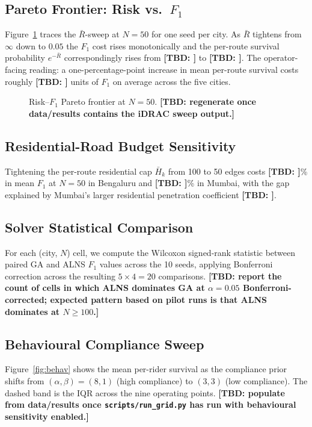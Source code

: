 \documentclass{ieeeaccess}
\newcommand{\TBD}[1]{\textbf{[TBD: #1]}}
\begin{document}
\subsection{Pareto Frontier: Risk vs.\ $F_1$}
Figure~\ref{fig:pareto} traces the $\bar{R}$-sweep at $N = 50$ for one
seed per city. As $\bar{R}$ tightens from $\infty$ down to $0.05$ the
$F_1$ cost rises monotonically and the per-route survival probability
$e^{-\bar{R}}$ correspondingly rises from \TBD{} to \TBD{}. The
operator-facing reading: a one-percentage-point increase in mean
per-route survival costs roughly \TBD{} units of $F_1$ on average across
the five cities.

\begin{figure}
\centerline{}
\caption{Risk--$F_1$ Pareto frontier at $N = 50$. \TBD{regenerate
once data/results contains the iDRAC sweep output.}}
\label{fig:pareto}
\end{figure}

\subsection{Residential-Road Budget Sensitivity}
Tightening the per-route residential cap $\bar{H}_k$ from 100 to 50
edges costs \TBD{}\% in mean $F_1$ at $N = 50$ in Bengaluru and \TBD{}\%
in Mumbai, with the gap explained by Mumbai's larger residential
penetration coefficient \TBD{}.

\subsection{Solver Statistical Comparison}
For each (city, $N$) cell, we compute the Wilcoxon signed-rank
statistic \cite{wilcoxon1945} between paired GA and ALNS $F_1$ values
across the 10 seeds, applying Bonferroni correction across the
resulting
$5 \times 4 = 20$ comparisons. \TBD{report the count of cells in
which ALNS dominates GA at $\alpha = 0.05$ Bonferroni-corrected;
expected pattern based on pilot runs is that ALNS dominates at
$N \geq 100$.}

\subsection{Behavioural Compliance Sweep}
Figure~\ref{fig:behav} shows the mean per-rider survival as the
compliance prior shifts from $(\alpha, \beta) = (8, 1)$ (high
compliance) to $(3, 3)$ (low compliance). The dashed band is the IQR
across the nine operating points. \TBD{populate from data/results
once \texttt{scripts/run\_grid.py} has run with behavioural sensitivity
enabled.}
\end{document}
